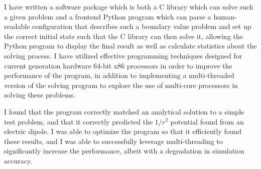 \documentclass[12pt]{article}
\begin{document}
I have written a software package which is both a C library which can solve such a given problem and a frontend
Python program which can parse a human-readable configuration that describes such a boundary value problem and
set up the correct initial state such that the C library can then solve it, allowing the Python program to
display the final result as well as calculate statistics about the solving process. I have utilized effective
programming techniques designed for current generation hardware 64-bit x86 processors in order to improve
the performance of the program, in addition to implementing a multi-threaded version of the solving program
to explore the use of multi-core processors in solving these problems.

I found that the program correctly matched an analytical solution to a simple test problem, and that it correctly
predicted the $1/r^2$ potential found from an electric dipole. I was able to optimize the program so that it
efficiently found these results, and I was able to successfully leverage multi-threading to significantly increase
the performance, albeit with a degradation in simulation accuracy.

\clearpage
\doublespacing







\end{document}

